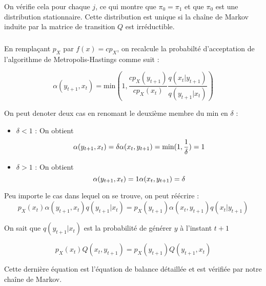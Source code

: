 On vérifie cela pour chaque $j$, ce qui montre que $\pi_0 = \pi_1$ et que $\pi_0$ est une distribution stationnaire. Cette distribution est unique si la chaîne de Markov induite par la matrice de transition $Q$ est irréductible. 

\subsubsection{}
En remplaçant $p_X$ par $f(x) = cp_X$, on recalcule la probabilté d'acceptation de l'algorithme de Metropolis-Hastings comme suit :

\begin{equation*}
  \alpha(y_{t+1},x_t) = \text{min}(1,\frac{cp_X(y_{t+1})}{cp_X(x_t)}\frac{q(x_t|y_{t+1})}{q(y_{t+1}|x_t)})
\end{equation*}

On peut denoter deux cas en renomant le deuxième membre du min en $\delta$ : 

\begin{itemize}
  \item $\delta < 1$ : On obtient 
  \begin{equation*}
    \alpha(y_{t+1},x_t) = \delta\\
    \alpha(x_t,y_{t+1}) = \text{min}(1,\frac{1}{\delta}) = 1
  \end{equation*}
  \item $\delta > 1$ : On obtient
  \begin{equation*}
    \alpha(y_{t+1},x_t) = 1\\
    \alpha(x_t,y_{t+1}) = \delta
  \end{equation*}
\end{itemize}

Peu importe le cas dans lequel on se trouve, on peut réécrire :
\begin{equation*}
  p_X(x_t)\alpha(y_{t+1},x_t)q(y_{t+1}|x_t) = p_X(y_{t+1})\alpha(x_t,y_{t+1})q(x_t|y_{t+1})
\end{equation*}

On sait que $q(y_{t+1}|x_t)$ est la probabilité de générer $y$ à l'instant $t+1$

\begin{equation*}
  p_X(x_t)Q(x_t,y_{t+1}) = p_X(y_{t+1})Q(y_{t+1},x_t)
\end{equation*}

Cette dernière équation est l'équation de balance détaillée et est vérifiée par notre chaîne de Markov.